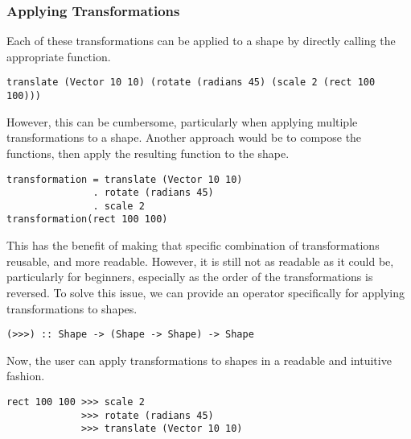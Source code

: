 \documentclass[../main.tex]{subfiles}
\begin{document}
            \subsubsection{Applying Transformations}
                Each of these transformations can be applied to a shape by directly calling the
                    appropriate function.

                \begin{lstlisting}
translate (Vector 10 10) (rotate (radians 45) (scale 2 (rect 100 100)))\end{lstlisting}

                However, this can be cumbersome, particularly when applying multiple
                    transformations to a shape.
                Another approach would be to compose the functions, then apply the resulting
                    function to the shape.

                \begin{lstlisting}
transformation = translate (Vector 10 10)
               . rotate (radians 45)
               . scale 2
transformation(rect 100 100)\end{lstlisting}

                This has the benefit of making that specific combination of transformations
                    reusable, and more readable.
                However, it is still not as readable as it could be, particularly for
                    beginners, especially as the order of the transformations is reversed.
                To solve this issue, we can provide an operator specifically for applying
                    transformations to shapes.

                \begin{lstlisting}[label={lst:transform}, caption={The transformation application (\texttt{>>>}) operator.}]
(>>>) :: Shape -> (Shape -> Shape) -> Shape\end{lstlisting}

                Now, the user can apply transformations to shapes in a readable and intuitive
                    fashion.

                \begin{lstlisting}
rect 100 100 >>> scale 2
             >>> rotate (radians 45)
             >>> translate (Vector 10 10)\end{lstlisting}
\end{document}
